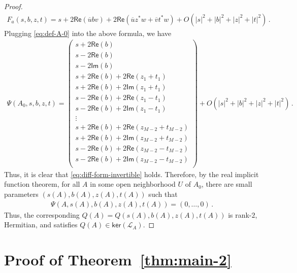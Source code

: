 \documentclass[11pt,reqno]{amsart}
\begin{document}
\begin{proof}
\begin{align*}
    F_a(s,b,z,t) = s + 2\mathsf{Re}(\overline{u}bv) + 2\mathsf{Re}(\overline{u} z^* w + \overline{v} t^* w) + O\left( |s|^2+|b|^2+|z|^2+|t|^2 \right) \,.
\end{align*}
Plugging \eqref{eq:def-A-0} into the above formula, we have 
\begin{align*}
    \Psi(A_0,s,b,z,t) = 
    \begin{pmatrix}
        s+2\mathsf{Re}(b) \\
        s-2\mathsf{Re}(b) \\
        s-2\mathsf{Im}(b) \\
        s+2\mathsf{Re}(b)+2\mathsf{Re}(z_1+t_1) \\
        s+2\mathsf{Re}(b)+2\mathsf{Im}(z_1+t_1) \\
        s-2\mathsf{Re}(b)+2\mathsf{Re}(z_1-t_1) \\
        s-2\mathsf{Re}(b)+2\mathsf{Im}(z_1-t_1) \\
        \vdots \\
        s+2\mathsf{Re}(b)+2\mathsf{Re}(z_{M-2}+t_{M-2}) \\
        s+2\mathsf{Re}(b)+2\mathsf{Im}(z_{M-2}+t_{M-2}) \\
        s-2\mathsf{Re}(b)+2\mathsf{Re}(z_{M-2}-t_{M-2}) \\
        s-2\mathsf{Re}(b)+2\mathsf{Im}(z_{M-2}-t_{M-2}) \\
    \end{pmatrix}
    + O\left( |s|^2+|b|^2+|z|^2+|t|^2 \right) \,.
\end{align*}
Thus, it is clear that \eqref{eq:diff-form-invertible} holds. Therefore, by the real implicit function theorem, for all $A$ in some open neighborhood $U$ of $A_0$, there are small parameters $(s(A),b(A),z(A),t(A))$ such that
\begin{align*}
    \Psi(A,s(A),b(A),z(A),t(A))=(0,\ldots,0) \,.
\end{align*}
Thus, the corresponding $Q(A)=Q(s(A),b(A),z(A),t(A))$ is rank-$2$, Hermitian, and satisfies $Q(A) \in \mathsf{ker}(\mathcal L_A)$.
\end{proof}





\section{Proof of Theorem~\ref{thm:main-2}}
\label{sec:proof-main-thm-2}
\end{document}
